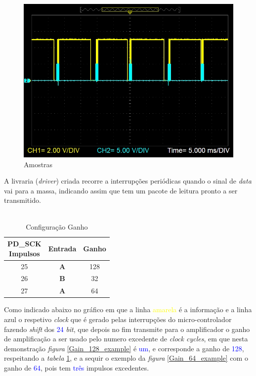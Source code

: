\begin{figure}[H]
	\centering
	\includegraphics[scale=0.55]{./image/PESTA/graph/80SPS64GAIN/SPS_80.JPG}
	\caption{Amostras}
	\label{SPS_64}
\end{figure}
A livraria (\textit{driver}) criada recorre a interrupções periódicas quando o sinal de \textit{data} vai para a massa, indicando assim que tem um pacote de leitura pronto a ser transmitido.
\\
\\
\begin{minipage}[!b]{.40\linewidth}
	\begin{table}[H]
		\captionsetup{justification=raggedright,singlelinecheck=false}
		\caption{Configuração Ganho}
		\begin{tabular}{ | c | c | c |  }
			\hline
			\makecell[c]{PD\_SCK \\ Impulsos} & Entrada  & Ganho \\
			\hline
			\hline
			25 & \textbf{A} & 128 \\
			\hline
			26 & \textbf{B} & 32 \\
			\hline
			27 & \textbf{A} & 64 \\
			\hline
		\end{tabular}
		\label{Gain_Selection}
	\end{table}
\end{minipage}
\begin{minipage}[l]{.6\linewidth}
\vspace{.3cm}
Como indicado abaixo no gráfico em que a linha \textcolor{yellow}{amarela} é a informação e a linha \textcolor{BlueGreen}{azul} o respetivo \textit{clock} que é gerado pelas interrupções do micro-controlador fazendo \textit{shift} dos \textcolor{blue}{24} \textit{bit}, que depois no fim transmite para o amplificador o ganho de amplificação a ser usado pelo numero excedente de \textit{clock cycles}, em que nesta demonstração \textit{figura} \ref{Gain_128_example} é \textcolor{blue}{um}, e corresponde a ganho de \textcolor{blue}{128}, respeitando a \textit{tabela} \ref{Gain_Selection},  e a sequir o exemplo da \textit{figura} \ref{Gain_64_example} com o ganho de \textcolor{blue}{64}, pois tem \textcolor{blue}{três} impulsos excedentes.
\\
\end{minipage}
